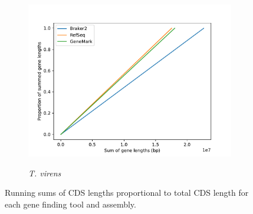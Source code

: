 \begin{figure}[ht]
  \ContinuedFloat
  \centering
    \begin{subfigure}{0.8\textwidth}
      \includegraphics[width=\textwidth]{figures/t-virens-cumulative-gene-lengths.pdf}
      \label{fig:tvirens-lengths}
      \caption{\textit{T. virens}}
    \end{subfigure}
  \label{fig:cds-lengths}
  \caption[Sums of CDS lengths]{Running sums of CDS lengths
    proportional to total CDS length for each gene finding tool and
    assembly.}
\end{figure}
